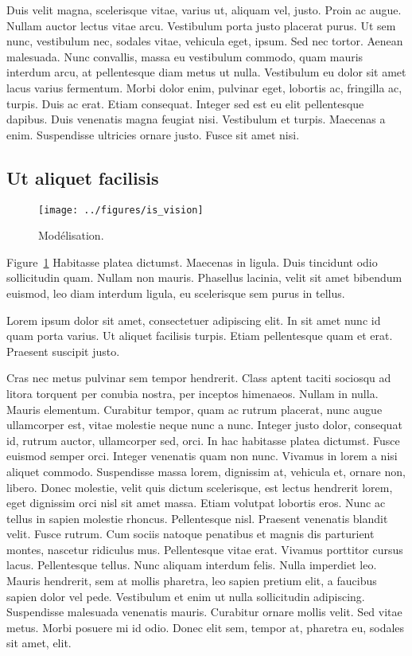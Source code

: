 \documentclass[../hdr.tex]{subfiles}
\begin{document}
Duis velit magna, scelerisque vitae, varius ut, aliquam vel, justo. Proin ac
augue. Nullam auctor lectus vitae arcu. Vestibulum porta justo placerat purus.
Ut sem nunc, vestibulum nec, sodales vitae, vehicula eget, ipsum. Sed nec
tortor. Aenean malesuada. Nunc convallis, massa eu vestibulum commodo, quam
mauris interdum arcu, at pellentesque diam metus ut nulla. Vestibulum eu dolor
sit amet lacus varius fermentum. Morbi dolor enim, pulvinar eget, lobortis ac,
fringilla ac, turpis. Duis ac erat. Etiam consequat. Integer sed est eu elit
pellentesque dapibus. Duis venenatis magna feugiat nisi. Vestibulum et turpis.
Maecenas a enim. Suspendisse ultricies ornare justo. Fusce sit amet nisi.

\subsection{Ut aliquet facilisis}

\begin{figure}[ht]
	\centering
	\texttt{[image: ../figures/is\_vision]}
	\caption{Modélisation.}
	\label{is_vision3}
\end{figure}

\bigskip 

Figure~\ref{is_vision3} Habitasse platea dictumst. Maecenas in ligula. Duis
tincidunt odio sollicitudin quam. Nullam non mauris. Phasellus lacinia, velit
sit amet bibendum euismod, leo diam interdum ligula, eu scelerisque sem purus in
tellus.

Lorem ipsum dolor sit amet, consectetuer adipiscing elit. In sit amet nunc id
quam porta varius. Ut aliquet facilisis turpis. Etiam pellentesque quam et erat.
Praesent suscipit justo.

Cras nec metus pulvinar sem tempor hendrerit. Class aptent taciti sociosqu ad
litora torquent per conubia nostra, per inceptos himenaeos. Nullam in nulla.
Mauris elementum. Curabitur tempor, quam ac rutrum placerat, nunc augue
ullamcorper est, vitae molestie neque nunc a nunc. Integer justo dolor,
consequat id, rutrum auctor, ullamcorper sed, orci. In hac habitasse platea
dictumst. Fusce euismod semper orci. Integer venenatis quam non nunc. Vivamus in
lorem a nisi aliquet commodo. Suspendisse massa lorem, dignissim at, vehicula
et, ornare non, libero. Donec molestie, velit quis dictum scelerisque, est
lectus hendrerit lorem, eget dignissim orci nisl sit amet massa. Etiam volutpat
lobortis eros. Nunc ac tellus in sapien molestie rhoncus. Pellentesque nisl.
Praesent venenatis blandit velit. Fusce rutrum. Cum sociis natoque penatibus et
magnis dis parturient montes, nascetur ridiculus mus. Pellentesque vitae erat.
Vivamus porttitor cursus lacus. Pellentesque tellus. Nunc aliquam interdum
felis. Nulla imperdiet leo. Mauris hendrerit, sem at mollis pharetra, leo sapien
pretium elit, a faucibus sapien dolor vel pede. Vestibulum et enim ut nulla
sollicitudin adipiscing. Suspendisse malesuada venenatis mauris. Curabitur
ornare mollis velit. Sed vitae metus. Morbi posuere mi id odio. Donec elit sem,
tempor at, pharetra eu, sodales sit amet, elit.
\end{document}
